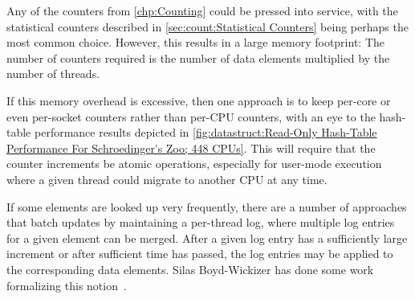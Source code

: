 Any of the counters from \cref{chp:Counting}
could be pressed into service, with the statistical counters described in
\cref{sec:count:Statistical Counters} being perhaps the most common choice.
However, this results in a large memory footprint: The number of counters
required is the number of data elements multiplied by the number of
threads.

If this memory overhead is excessive, then one approach is to keep
per-core or even per-socket counters rather than per-CPU counters,
with an eye to the hash-table performance results depicted in
\cref{fig:datastruct:Read-Only Hash-Table Performance For Schroedinger's Zoo; 448 CPUs}.
This will require that the counter increments be atomic operations,
especially for user-mode execution where a given thread could migrate
to another CPU at any time.

If some elements are looked up very frequently, there are a number
of approaches that batch updates by maintaining a per-thread log,
where multiple log entries for a given element can be merged.
After a given log entry has a sufficiently large increment or after
sufficient time has passed, the log entries may be applied to the
corresponding data elements.
Silas Boyd-Wickizer has done some work formalizing this
notion~\cite{SilasBoydWickizerPhD}.
